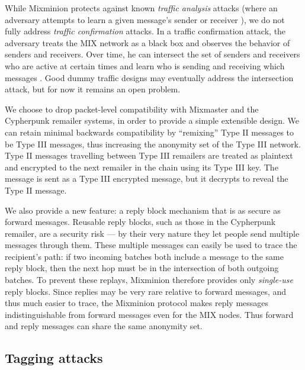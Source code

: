 \documentclass{llncs}
\begin{document}
While Mixminion protects against known \emph{traffic analysis} attacks
(where an adversary attempts to learn a given message's sender or
receiver \cite{rackoff93cryptographic,raymond00}), we do not fully
address \emph{traffic confirmation} attacks. In a traffic confirmation
attack, the adversary treats the MIX network as a black box and
observes the behavior of senders and receivers. Over time, he can
intersect the set of senders and receivers who are active at certain
times and learn who is sending and receiving which messages
\cite{langos02}. Good dummy traffic designs may eventually address the
intersection attack, but for now it remains an open problem.

We choose to drop packet-level compatibility with Mixmaster and the
Cypherpunk remailer systems, in order to provide a simple extensible
design. We can retain minimal backwards compatibility by ``remixing''
Type II messages to be Type III messages, thus increasing the anonymity
set of the Type III network. Type II messages travelling between
Type III remailers are treated
as plaintext and encrypted to the next remailer in the chain using its
Type III key. The message is sent as a Type III encrypted message, but
it decrypts to reveal the Type II message.

We also provide a new feature: a reply block mechanism that is as secure
as forward messages.
Reusable reply blocks, such as those in the Cypherpunk remailer, are a
security risk --- by their very nature they let people send multiple
messages through them.  These multiple messages can easily be used to
trace the recipient's path: if two incoming batches both include a
message to the same reply block, then the next hop must be in the
intersection of both outgoing batches.  To prevent these replays,
Mixminion therefore provides only \emph{single-use} reply blocks. Since
replies may be very rare relative to forward messages, and thus
much easier to trace, the Mixminion protocol makes reply messages
indistinguishable from forward messages even for the MIX nodes. Thus
forward and reply messages can share the same anonymity set.

\subsection{Tagging attacks}
\label{subsec:tagging-attacks}
\end{document}
